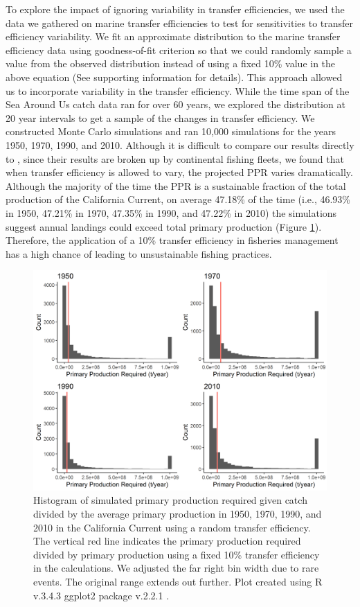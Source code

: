 \documentclass[oneside,12pt,final]{sty/ucthesis-CA2012}
\let\cite\citep                             %
\begin{document}
\begin{mainmatter}
To explore the impact of ignoring variability in transfer efficiencies, we used the data we gathered on marine transfer efficiencies to test for sensitivities to transfer efficiency variability. We fit an approximate distribution to the marine transfer efficiency data using goodness-of-fit criterion so that we could randomly sample a value from the observed distribution instead of using a fixed 10\% value in the above equation (See supporting information for details). This approach allowed us to incorporate variability in the transfer efficiency. While the time span of the Sea Around Us catch data ran for over 60 years, we explored the distribution at 20 year intervals to get a sample of the changes in transfer efficiency. We constructed Monte Carlo simulations and ran 10,000 simulations for the years 1950, 1970, 1990, and 2010. Although it is difficult to compare our results directly to \citet{watson2014primary}, since their results are broken up by continental fishing fleets, we found that when transfer efficiency is allowed to vary, the projected PPR varies dramatically. Although the majority of the time the PPR is a sustainable fraction of the total production of the California Current, on average 47.18\% of the time (i.e., 46.93\% in 1950, 47.21\% in 1970, 47.35\% in 1990, and 47.22\% in 2010) the simulations suggest annual landings could exceed total primary production (Figure \ref{ppr}). Therefore, the application of a 10\% transfer efficiency in fisheries management has a high chance of leading to unsustainable fishing practices. 

\begin{figure}[H]
     \centering
       \includegraphics[width=.8\textwidth]{fig/hist_ppr_1950_2010}
    \caption{Histogram of simulated primary production required given catch divided by the average primary production in 1950, 1970, 1990, and 2010 in the California Current using a random transfer efficiency. The vertical red line indicates the primary production required divided by primary production using a fixed 10\% transfer efficiency in the calculations. We adjusted the far right bin width due to rare events. The original range extends out further. Plot created using R v.3.4.3 \cite{Rcite} ggplot2 package v.2.2.1 \cite{ggplot}. }
    \label{ppr}
\end{figure}


\end{mainmatter}
\end{document}
